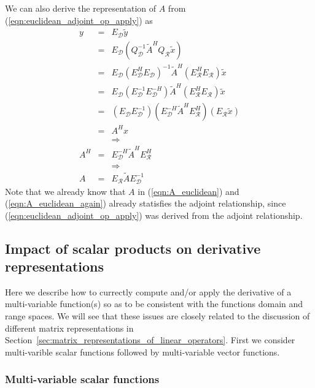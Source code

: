 We can also derive the representation of $A$ from
(\ref{eqn:euclidean_adjoint_op_apply}) as
%
\begin{eqnarray}
y
& = & E_{\mathcal{D}} \tilde{y} \nonumber \\
& = & E_{\mathcal{D}} ( Q_{\mathcal{D}}^{-1} \tilde{A}^H Q_{\mathcal{R}} \tilde{x} ) \nonumber \\
& = & E_{\mathcal{D}} ( E_{\mathcal{D}}^H E_{\mathcal{D}} )^{-1} \tilde{A}^H ( E_{\mathcal{R}}^H E_{\mathcal{R}} ) \tilde{x} \nonumber \\
& = & E_{\mathcal{D}} ( E_{\mathcal{D}}^{-1} E_{\mathcal{D}} ^{-H} ) \tilde{A}^H ( E_{\mathcal{R}}^H E_{\mathcal{R}} ) \tilde{x} \nonumber \\
& = & ( E_{\mathcal{D}} E_{\mathcal{D}}^{-1} ) ( E_{\mathcal{D}} ^{-H} \tilde{A}^H E_{\mathcal{R}}^H ) ( E_{\mathcal{R}} \tilde{x} ) \nonumber \\
& = & A^H x \nonumber \\
&  & \Rightarrow \nonumber \\
A^H & = & E_{\mathcal{D}}^{-H} \tilde{A}^H E_{\mathcal{R}}^H  \nonumber \\
\label{eqn:A_euclidean_adjoint} 
&  & \Rightarrow \nonumber \\
A & = & E_{\mathcal{R}} \tilde{A} E_{\mathcal{D}}^{-1}
\label{eqn:A_euclidean_again}
\end{eqnarray}
%
Note that we already know that $A$ in (\ref{eqn:A_euclidean}) and
(\ref{eqn:A_euclidean_again}) already statisfies the adjoint relationship,
since (\ref{eqn:euclidean_adjoint_op_apply}) was derived from the adjoint
relationship.

\subsection{Impact of scalar products on derivative representations}

Here we describe how to currectly compute and/or apply the derivative of a
multi-variable function(s) so as to be consistent with the functions domain
and range spaces.  We will see that these issues are closely related to the
discussion of different matrix representations in
Section~\ref{sec:matrix_representations_of_linear_operators}.  First we
consider multi-varible scalar functions followed by multi-variable vector
functions.

\subsubsection{Multi-variable scalar functions}
\label{sec:scalar_function_derivatives}
 
